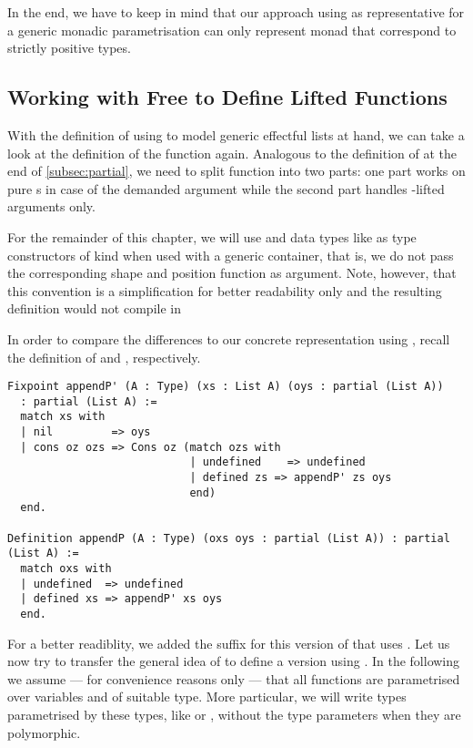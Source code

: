 In the end, we have to keep in mind that our approach using
 as representative for a generic monadic parametrisation
can only represent monad that correspond to strictly positive types.

\subsection{Working with Free to Define Lifted Functions}
\label{subsec:liftedFunctions}

With the definition of  using  to model generic
effectful lists at hand, we can take a look at the definition of the
function  again.
Analogous to the definition of  at the end of
\autoref{subsec:partial}, we need to split function into two parts:
one part works on pure s in case of the demanded argument
while the second part handles -lifted arguments only.

For the remainder of this chapter, we will use  and
data types like  as type constructors of kind  when used with a generic container, that is, we do not pass
the corresponding shape and position function as argument.
Note, however, that this convention is a simplification for better
readability only and the resulting definition would not compile in

In order to compare the differences to our concrete representation
using , recall the definition of  and
, respectively.

\begin{verbatim}
Fixpoint appendP' (A : Type) (xs : List A) (oys : partial (List A))
  : partial (List A) :=
  match xs with
  | nil         => oys
  | cons oz ozs => Cons oz (match ozs with
                            | undefined    => undefined
                            | defined zs => appendP' zs oys
                            end)
  end.

Definition appendP (A : Type) (oxs oys : partial (List A)) : partial (List A) :=
  match oxs with
  | undefined  => undefined
  | defined xs => appendP' xs oys
  end.
\end{verbatim}

For a better readiblity, we added the suffix  for this version
of  that uses .
Let us now try to transfer the general idea of  to
define a version using .
In the following we assume --- for convenience reasons only --- that
all functions are parametrised over variables  and
 of suitable type.
More particular, we will write types parametrised by these types, like
 or , without the type parameters when they are
polymorphic.

